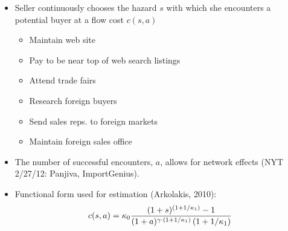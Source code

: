 \documentclass[notes=show]{beamer}
\begin{document}
\begin{frame}%



\begin{itemize}
\item Seller continuously chooses the hazard $s$ with which she encounters a
potential buyer at a flow cost $c(s,a)$

\begin{itemize}
\item Maintain web site

\item Pay to be near top of web search listings

\item Attend trade fairs

\item Research foreign buyers

\item Send sales reps. to foreign markets

\item Maintain foreign sales office
\end{itemize}

\item The number of successful encounters, $a$, allows for network effects
(NYT 2/27/12: Panjiva, ImportGenius).

\item Functional form used for estimation (Arkolakis, 2010):%
\[
c(s,a)=\kappa _{0}\frac{(1+s)^{\left( 1+1/\kappa _{1}\right) }-1}{%
(1+a)^{\gamma \cdot \left( 1+1/\kappa _{1}\right) }\left( 1+1/\kappa
_{1}\right) } 
\]
\end{itemize}

\end{frame}%
\end{document}
